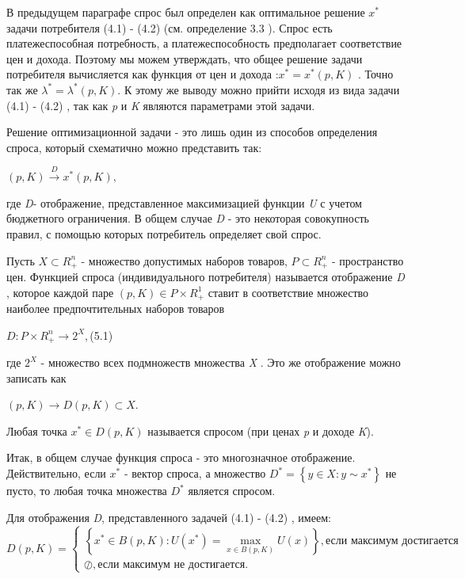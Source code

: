 \documentclass[12pt, 4paper]{book}
\begin{document}
{В предыдущем параграфе спрос был определен как оптимальное решение $x^{*}$ задачи потребителя (4.1) - (4.2) (см. определение 3.3 ). Спрос есть платежеспособная потребность, а платежеспособность предполагает соответствие цен и дохода. Поэтому мы можем утверждать, что общее решение задачи потребителя вычисляется как функция от цен и дохода :$x^{*} = x^{*} (p,K)$ . Точно так же  $\lambda ^{*} = \lambda ^ {*}(p,K)$. К этому же выводу можно прийти исходя из вида задачи (4.1) - (4.2) , так как \textit{p} и \textit{K} являются параметрами этой задачи.
\par

Решение оптимизационной задачи - это лишь один из способов определения спроса, который схематично можно представить так: 
\begin{center}
$(p,K)\stackrel{D}{\rightarrow} x^{*}(p,K),$
\end{center}
где \textit{D}- отображение, представленное максимизацией функции \textit{U} с учетом бюджетного ограничения. В общем случае \textit{D} - это некоторая совокупность правил, с помощью которых потребитель определяет свой спрос. 
\par

Пусть $X \subset R_{+}^{n}$ - множество допустимых наборов товаров, $P \subset R_{+}^{n}$ - пространство цен. Функцией спроса (индивидуального потребителя) называется отображение \textit{D} , которое каждой паре $(p,K) \in P \times R_{+}^1$ ставит в соответствие множество наиболее предпочтительных наборов товаров 
\begin{center}
$D:P \times R_{+}^{n} \rightarrow 2^X,$(5.1)
\end{center}
где $2^X$ - множество всех подмножеств множества \textit{X} . Это же отображение можно записать как
\begin{center}
$(p,K) \rightarrow D(p,K) \subset X$.
\end{center}
\par

Любая точка $x^{*}\in D(p,K)$ называется спросом (при ценах \textit{p} и доходе \textit{K}). 
\par

Итак, в общем случае функция спроса - это многозначное отображение. Действительно, если  $x^{*}$ - вектор спроса, а множество $D^{*} = \left\{y \in X : y \sim x^{*} \right\}$ не пусто, то любая точка множества $D^{*}$ является спросом.
\par

Для отображения \textit{D}, представленного задачей (4.1) - (4.2) , имеем: 
$$ D(p,K)= \left\{
\begin{aligned}
\left\{ x^{*} \in B(p,K):U(x^{*}) = \max\limits_{x \in B(p,K)} U(x) \right\},\text {если максимум достигается}\\
\oslash , \text {если максимум не достигается.}
\end{aligned}
\right.$$
\par

}
\end{document}
